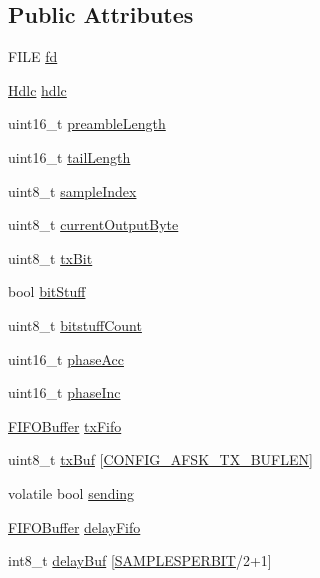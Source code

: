 \subsection*{Public Attributes}
\begin{DoxyCompactItemize}
\item 
F\+I\+LE \hyperlink{struct_afsk_a539f9d0fd0fcdd2523aa9b5694207288}{fd}
\item 
\hyperlink{struct_hdlc}{Hdlc} \hyperlink{struct_afsk_a0f2cf84d5882a74b33b54828e4adda6d}{hdlc}
\item 
uint16\+\_\+t \hyperlink{struct_afsk_a586542863e66d99dbb7b655fa54af563}{preamble\+Length}
\item 
uint16\+\_\+t \hyperlink{struct_afsk_aa3297e8885c70332e9274679b9329937}{tail\+Length}
\item 
uint8\+\_\+t \hyperlink{struct_afsk_a6a63466f08a5391a6515479363283fdf}{sample\+Index}
\item 
uint8\+\_\+t \hyperlink{struct_afsk_abcc27bcdd8198ea3e46df974f7a17664}{current\+Output\+Byte}
\item 
uint8\+\_\+t \hyperlink{struct_afsk_a763bb48860d3ba79de2dd1abffa2ad89}{tx\+Bit}
\item 
bool \hyperlink{struct_afsk_aece27671c62a8c93ce32e4bd6c38f312}{bit\+Stuff}
\item 
uint8\+\_\+t \hyperlink{struct_afsk_ab6ea81ad33d9cf98080a6e567cfd7887}{bitstuff\+Count}
\item 
uint16\+\_\+t \hyperlink{struct_afsk_aa62658bb66ca18cf3d268258ef126283}{phase\+Acc}
\item 
uint16\+\_\+t \hyperlink{struct_afsk_ae5f800f21b5aa819af756c5572e63cce}{phase\+Inc}
\item 
\hyperlink{struct_f_i_f_o_buffer}{F\+I\+F\+O\+Buffer} \hyperlink{struct_afsk_a987e70d174e5cd82f73563d920273cc4}{tx\+Fifo}
\item 
uint8\+\_\+t \hyperlink{struct_afsk_a32162873b8784efe43d3f28289c6ea6e}{tx\+Buf} \mbox{[}\hyperlink{_a_f_s_k_8h_adc5f6ad59595e8b2c14827f5012c6f4f}{C\+O\+N\+F\+I\+G\+\_\+\+A\+F\+S\+K\+\_\+\+T\+X\+\_\+\+B\+U\+F\+L\+EN}\mbox{]}
\item 
volatile bool \hyperlink{struct_afsk_aea4204b922aaf2c78708bacec08d7888}{sending}
\item 
\hyperlink{struct_f_i_f_o_buffer}{F\+I\+F\+O\+Buffer} \hyperlink{struct_afsk_a326b5be68b2c9bb6191ac8d76a021999}{delay\+Fifo}
\item 
int8\+\_\+t \hyperlink{struct_afsk_aab24e087341259c5e3f9008a8557644e}{delay\+Buf} \mbox{[}\hyperlink{_a_f_s_k_8h_a15440d8d1e6efc47a3263ccf91a8cb74}{S\+A\+M\+P\+L\+E\+S\+P\+E\+R\+B\+IT}/2+1\mbox{]}

\end{DoxyCompactItemize}
